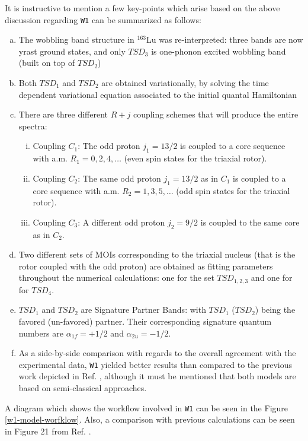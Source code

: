 \documentclass[11pt]{article}
\begin{document}
It is instructive to mention a few key-points which arise based on the above discussion regarding \texttt{W1} can be summarized as follows:

\begin{enumerate}[(a)]
    \item The wobbling band structure in $^{163}$Lu was re-interpreted: three bands are now yrast ground states, and only $TSD_3$ is one-phonon excited wobbling band (built on top of $TSD_2$)
    \item Both $TSD_1$ and $TSD_2$ are obtained variationally, by solving the time dependent variational equation associated to the initial quantal Hamiltonian
    \item There are three different $R+j$ coupling schemes that will produce the entire spectra:
    \begin{enumerate}[(i)]
        \item Coupling $C_1$: The odd proton $j_1={13/2}$ is coupled to a core sequence with a.m. $R_1=0,2,4,\dots$ (even spin states for the triaxial rotor).
        \item Coupling $C_2$: The same odd proton $j_1={13/2}$ as in $C_1$ is coupled to a core sequence with a.m. $R_2=1,3,5,\dots$ (odd spin states for the triaxial rotor).
        \item Coupling $C_3$: A different odd proton $j_2={9/2}$ is coupled to the same core as in $C_2$.
    \end{enumerate}
    \item Two different sets of MOIs corresponding to the triaxial nucleus (that is the rotor coupled with the odd proton) are obtained as fitting parameters throughout the numerical calculations: one for the set $TSD_{1,2,3}$ and one for for $TSD_4$.
    \item $TSD_1$ and $TSD_2$ are Signature Partner Bands: with $TSD_1$ ($TSD_2$) being the favored (un-favored) partner. Their corresponding signature quantum numbers are $\alpha_{1f}=+1/2$ and $\alpha_{2u}=-1/2$.
    \item As a side-by-side comparison with regards to the overall agreement with the experimental data, \texttt{W1} yielded better results than compared to the previous work depicted in Ref. \cite{raduta2007semiclassical}, although it must be mentioned that both models are based on semi-classical approaches.
\end{enumerate}

A diagram which shows the workflow involved in \texttt{W1} can be seen in the Figure \ref{w1-model-worfklow}. Also, a comparison with previous calculations can be seen in Figure 21 from Ref. \cite{raduta2020approach}.
\end{document}
